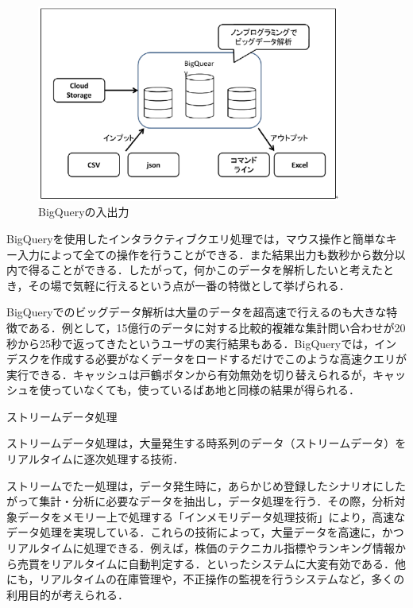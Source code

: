\begin{figure}[H]
\centering
\includegraphics[width=10cm]{bigqueryinout.png}
\caption{BigQueryの入出力}\label{サンプル図}
\end{figure}


BigQueryを使用したインタラクティブクエリ処理では，マウス操作と簡単なキー入力によって全ての操作を行うことができる．また結果出力も数秒から数分以内で得ることができる．したがって，何かこのデータを解析したいと考えたとき，その場で気軽に行えるという点が一番の特徴として挙げられる．

BigQueryでのビッグデータ解析は大量のデータを超高速で行えるのも大きな特徴である．例として，15億行のデータに対する比較的複雑な集計問い合わせが20秒から25秒で返ってきたというユーザの実行結果もある．BigQueryでは，インデスクを作成する必要がなくデータをロードするだけでこのような高速クエリが実行できる．キャッシュは戸鶴ボタンから有効無効を切り替えられるが，キャッシュを使っていなくても，使っているばあ地と同様の結果が得られる．\cite{bigquerystart}



ストリームデータ処理

ストリームデータ処理は，大量発生する時系列のデータ（ストリームデータ）をリアルタイムに逐次処理する技術．

ストリームでたー処理は，データ発生時に，あらかじめ登録したシナリオにしたがって集計・分析に必要なデータを抽出し，データ処理を行う．その際，分析対象データをメモリー上で処理する「インメモリデータ処理技術」により，高速なデータ処理を実現している．これらの技術によって，大量データを高速に，かつリアルタイムに処理できる．例えば，株価のテクニカル指標やランキング情報から売買をリアルタイムに自動判定する．といったシステムに大変有効である．他にも，リアルタイムの在庫管理や，不正操作の監視を行うシステムなど，多くの利用目的が考えられる．\cite{bigquerystart}

